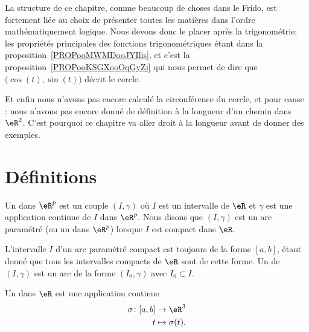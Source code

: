 
La structure de ce chapitre, comme beaucoup de choses dans le Frido, est fortement liée au choix de présenter toutes les matières dans l'ordre mathématiquement logique. Nous devons donc le placer après la trigonométrie; les propriétés principales des fonctions trigonométriques étant dans la proposition~\ref{PROPooMWMDooJYIlis}, et c'est la proposition~\ref{PROPooKSGXooOqGyZj} qui nous permet de dire que \( \big( \cos(t),\sin(t) \big)\) décrit le cercle.

Et enfin nous n'avons pas encore calculé la circonférence du cercle, et pour cause : nous n'avons pas encore donné de définition à la longueur d'un chemin dans \( \eR^2\). C'est pourquoi ce chapitre va aller droit à la longueur avant de donner des exemples.

\section{Définitions}        \label{SecDeExCPar}

\begin{definition}
    Un  dans $\eR^p$ est un couple $(I,\gamma)$ où $I$ est un intervalle de $\eR$ et $\gamma$ est une application continue de $I$ dans $\eR^p$. Nous disons que $(I,\gamma)$ est un arc paramétré  (ou un  dans $\eR^p$) lorsque $I$ est compact dans $\eR$.
\end{definition}
L'intervalle $I$ d'un arc paramétré compact est toujours de la forme $[a,b]$, étant donné que tous les intervalles compacts de $\eR$ sont de cette forme. Un  de $(I,\gamma)$ est un arc de la forme $(I_0,\gamma)$ avec $I_0\subset I$.

\begin{definition}
    Un  dans $\eR$ est une application continue
    \begin{equation}
        \begin{aligned}
            \sigma\colon [a,b]&\to \eR^3 \\
            t&\mapsto \sigma(t).
        \end{aligned}
    \end{equation}
\end{definition}

